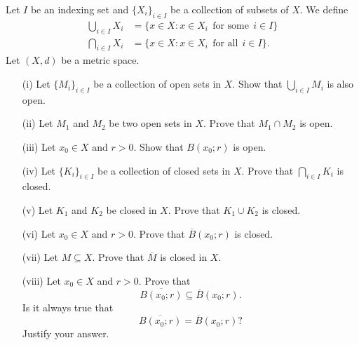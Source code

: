 \documentclass[a4paper]{article}
\begin{document}
\begin{problem}
    Let \( I  \) be an indexing set and \( \{ {X}_{i} \}_{i \in I} \) be a collection of subsets of \( X  \). We define
    \begin{align*}
        \bigcup_{ i \in I  }^{  }  {X}_{i} &= \{ x \in X : x \in {X}_{i} \ \ \text{for some} \ \ i \in I  \}  \\ 
        \bigcap_{ i \in I  }^{  }  {X}_{i} &= \{ x \in X : x \in {X}_{i} \ \ \text{for all} \ \ i \in I  \}.
    \end{align*}
    Let \( (X,d) \) be a metric space.
    \begin{enumerate}
        \item[(i)] Let \( \{ {M}_{i} \}_{i \in I} \) be a collection of open sets in \( X  \). Show that \( \bigcup_{ i \in I  }^{  }  {M}_{i} \) is also open.
        \item[(ii)] Let \( {M}_{1}  \) and \( {M}_{2} \) be two open sets in \( X  \). Prove that \( {M}_{1} \cap {M}_{2} \) is open.
        \item[(iii)] Let \( {x}_{0} \in X  \) and \( r > 0  \). Show that \( B({x}_{0}; r)  \) is open.
        \item[(iv)] Let \( \{ {K}_{i} \}_{i \in I} \) be a collection of closed sets in \( X  \). Prove that \( \bigcap_{ i \in I  }^{  }  {K}_{i} \) is closed.
        \item[(v)] Let \( {K}_{1} \) and \( {K}_{2} \) be closed in \( X  \). Prove that \( {K}_{1} \cup {K}_{2} \) is closed.
        \item[(vi)] Let \( {x}_{0} \in X  \) and \( r > 0  \). Prove that \( \overline{B}({x}_{0};r) \) is closed. 
        \item[(vii)] Let \( M \subseteq X  \). Prove that \( \overline{M} \) is closed in \( X  \).
        \item[(viii)] Let \( {x}_{0} \in X  \) and \( r > 0  \). Prove that 
            \[  \overline{B({x}_{0};r)} \subseteq \overline{B}({x}_{0}; r). \]
            Is it always true that 
            \[  \overline{B({x}_{0};r)} = \overline{B}({x}_{0};r)? \]
            Justify your answer.
    \end{enumerate}
\end{problem}
\end{document}
